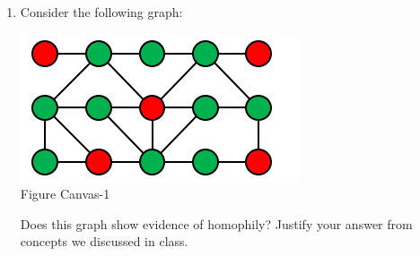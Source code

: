 \documentclass[11pt]{article}
\begin{document}
\begin{enumerate} 
	\item Consider the following graph:
	\begin{center}
		\includegraphics[scale=1]{canvas-1}\\
		Figure Canvas-1
	\end{center}
 	Does this graph show evidence of homophily? Justify your answer from concepts we discussed in class.
\end{enumerate}
\end{document}
